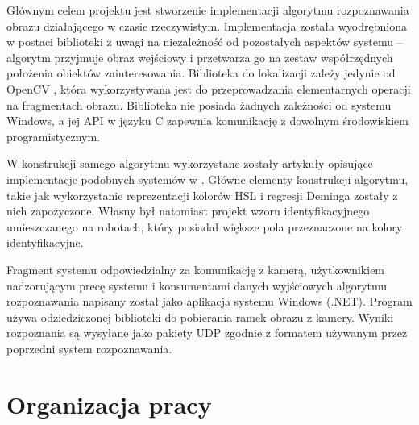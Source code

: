 \documentclass[polish,12pt]{aghthesis}
\begin{document}

Głównym celem projektu jest stworzenie implementacji algorytmu rozpoznawania
obrazu działającego w czasie rzeczywistym. Implementacja została wyodrębniona
w postaci biblioteki z uwagi na niezależność od pozostałych aspektów systemu --
algorytm przyjmuje obraz wejściowy i przetwarza go na zestaw współrzędnych
położenia obiektów zainteresowania. Biblioteka do lokalizacji zależy jedynie od 
OpenCV \cite{opencv}, która wykorzystywana jest do przeprowadzania 
elementarnych operacji na fragmentach obrazu. Biblioteka nie posiada żadnych 
zależności od systemu Windows, a jej API w języku C zapewnia komunikację z 
dowolnym środowiskiem programistycznym.

W konstrukcji samego algorytmu wykorzystane zostały artykuły opisujące 
implementacje podobnych systemów w \cite{largeleague} \cite{exemplary}
\cite{colortag}. Główne elementy konstrukcji algorytmu, takie jak wykorzystanie
reprezentacji kolorów HSL i regresji Deminga zostały z nich zapożyczone. Własny
był natomiast projekt wzoru identyfikacyjnego umieszczanego na robotach, który
posiadał większe pola przeznaczone na kolory identyfikacyjne.

Fragment systemu odpowiedzialny za komunikację z kamerą, użytkownikiem 
nadzorującym precę systemu i konsumentami danych 
wyjściowych algorytmu rozpoznawania napisany został jako aplikacja systemu
Windows (.NET). Program używa odziedziczonej biblioteki do pobierania ramek
obrazu z kamery. Wyniki rozpoznania są wysyłane jako pakiety UDP zgodnie z
formatem używanym przez poprzedni system rozpoznawania.







\section{Organizacja pracy}
\label{sec:organizacja-pracy}
% 
\end{document}
